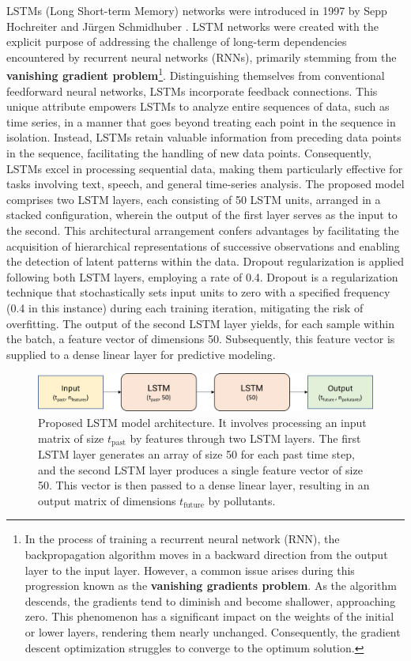 LSTMs (Long Short-term Memory) networks were introduced in 1997 by Sepp Hochreiter and Jürgen Schmidhuber \cite{hochreiter}. LSTM networks were created with the explicit purpose of addressing the challenge of long-term dependencies encountered by recurrent neural networks (RNNs), primarily stemming from the \textbf{vanishing gradient problem}\footnote{
In the process of training a recurrent neural network (RNN), the backpropagation algorithm moves in a backward direction from the output layer to the input layer. However, a common issue arises during this progression known as the \textbf{vanishing gradients problem}. As the algorithm descends, the gradients tend to diminish and become shallower, approaching zero. This phenomenon has a significant impact on the weights of the initial or lower layers, rendering them nearly unchanged. Consequently, the gradient descent optimization struggles to converge to the optimum solution. }. Distinguishing themselves from conventional feedforward neural networks, LSTMs incorporate feedback connections. This unique attribute empowers LSTMs to analyze entire sequences of data, such as time series, in a manner that goes beyond treating each point in the sequence in isolation. Instead, LSTMs retain valuable information from preceding data points in the sequence, facilitating the handling of new data points. Consequently, LSTMs excel in processing sequential data, making them particularly effective for tasks involving text, speech, and general time-series analysis.
The proposed model comprises two LSTM layers, each consisting of 50 LSTM units, arranged in a stacked configuration, wherein the output of the first layer serves as the input to the second. This architectural arrangement confers advantages by facilitating the acquisition of hierarchical representations of successive observations and enabling the detection of latent patterns within the data. Dropout regularization is applied following both LSTM layers, employing a rate of 0.4. Dropout is a regularization technique that stochastically sets input units to zero with a specified frequency (0.4 in this instance) during each training iteration, mitigating the risk of overfitting.
The output of the second LSTM layer yields, for each sample within the batch, a feature vector of dimensions 50. Subsequently, this feature vector is supplied to a dense linear layer for predictive modeling.

\begin{figure}
    \centering
    \includegraphics[width=0.7\linewidth]{images/model architectures/lstmmodel.png}
    \caption{Proposed LSTM model architecture. It involves processing an input matrix of size $t_{\text{past}}$ by features through two LSTM layers. The first LSTM layer generates an array of size 50 for each past time step, and the second LSTM layer produces a single feature vector of size 50. This vector is then passed to a dense linear layer, resulting in an output matrix of dimensions $t_{\text{future}}$ by pollutants.}
    \label{fig:lstmmodel}
\end{figure}

